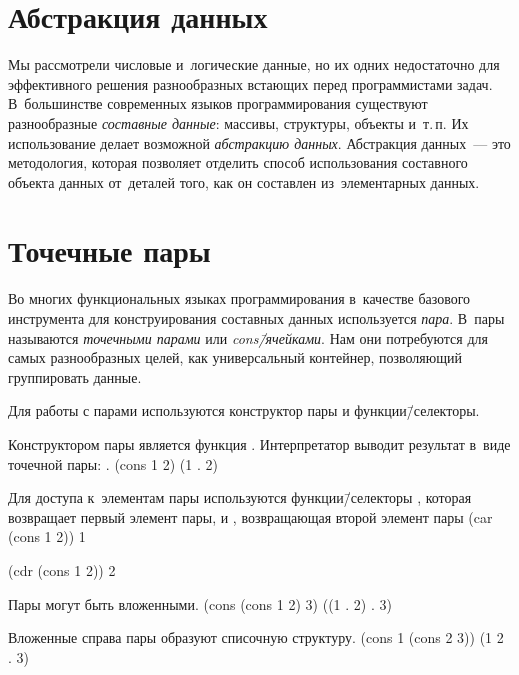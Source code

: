 \label{Less:lists}

\section[2]{Абстракция данных}%
Мы рассмотрели числовые и~логические данные, но их одних недостаточно для эффективного решения разнообразных встающих перед программистами задач. В~большинстве современных языков программирования существуют разнообразные \emph{составные данные}: массивы, структуры, объекты и~т.\,п. Их использование делает возможной \emph{абстракцию данных}. Абстракция данных~--- это методология, которая позволяет отделить способ использования составного объекта данных от~деталей того, как он составлен из~элементарных данных.


\section[2]{Точечные пары}\label{pair}%
Во многих функциональных языках программирования в~качестве базового инструмента для конструирования составных данных используется \emph{пара}. В~\Scheme пары называются \emph{точечными парами} или \emph{cons\=/ячейками}. Нам они потребуются для самых разнообразных целей, как универсальный контейнер, позволяющий группировать данные.

Для работы с парами используются конструктор пары и функции\=/селекторы.

\begin{example}{%
Конструктором пары является функция . Интерпретатор выводит результат в~виде точечной пары: .}
\REPL
  {(cons 1 2)}
  {(1 . 2)}
\end{example}

\begin{example}{%
Для доступа к~элементам пары используются функции\=/селекторы , которая возвращает первый элемент пары, и , возвращающая второй элемент пары}
\REPL
  {(car (cons 1 2))}
  {1}

\REPL
  {(cdr (cons 1 2))}
  {2}
\end{example}

\begin{example}{%
Пары могут быть вложенными.}
\REPL
  {(cons (cons 1 2) 3)}
  {((1 . 2) . 3)}
\end{example}

\begin{example}{%
Вложенные справа пары образуют списочную структуру.}
\REPL
  {(cons 1 (cons 2 3))}
  {(1 2 . 3)}
\end{example}

